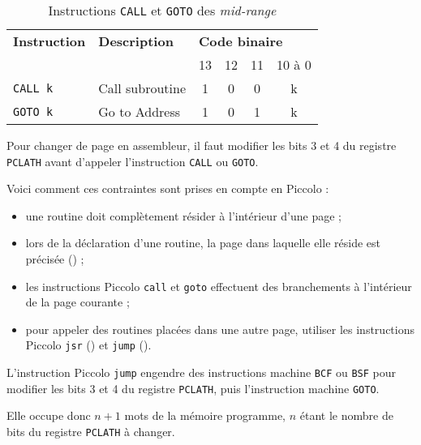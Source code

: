 \begin{table}[!ht]
  \centering
  \small
  \begin{tabular}{llcccc}
    \textbf{Instruction} & \textbf{Description} & \multicolumn{4}{l}{\bf Code binaire}\\
                         &                      & 13 & 12 & 11 & 10 à 0\\
    \hline
    \texttt{CALL k}  & Call subroutine & 1 & 0 & 0 & k \\
    \texttt{GOTO k}  & Go to Address   & 1 & 0 & 1 & k \\
    \hline
  \end{tabular}
  \caption{Instructions \texttt{CALL} et \texttt{GOTO} des \emph{mid-range}}
\end{table}



Pour changer de page en assembleur, il faut modifier les bits 3 et 4 du registre \texttt{PCLATH} avant d'appeler l'instruction \texttt{CALL} ou \texttt{GOTO}.

Voici comment ces contraintes sont prises en compte en Piccolo :
\begin{itemize}
  \item une routine doit complètement résider à l'intérieur d'une page ;
  \item lors de la déclaration d'une routine, la page dans laquelle elle réside est précisée () ;
  \item les instructions Piccolo \texttt{call} et \texttt{goto} effectuent des branchements à l'intérieur de la page courante ;
  \item pour appeler des routines placées dans une autre page, utiliser les instructions Piccolo \texttt{jsr} () et \texttt{jump} ().
\end{itemize}




L'instruction Piccolo  \texttt{jump} engendre des instructions machine \texttt{BCF} ou \texttt{BSF} pour modifier les bits 3 et 4 du registre \texttt{PCLATH}, puis l'instruction machine \texttt{GOTO}.

Elle occupe donc $n+1$ mots de la mémoire programme, $n$ étant le nombre de bits du registre \texttt{PCLATH} à changer.




